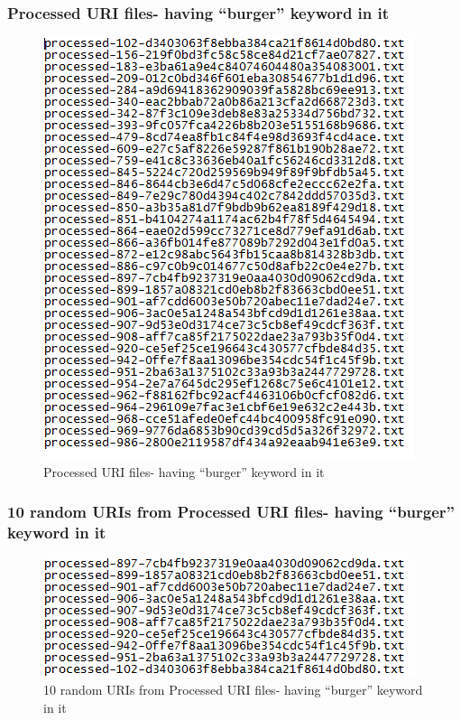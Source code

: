 \subsubsection{Processed URI files- having ``burger'' keyword in it}
\begin{figure}[ht]    
    \begin{center}
        \includegraphics[scale=0.9]{uris_with_burger.png}
        \caption{Processed URI files- having ``burger'' keyword in it}
        \label{Processed URI files- having ``burger'' keyword in it}
    \end{center}
\end{figure}
\newpage
\subsubsection{10 random URIs from Processed URI files- having ``burger'' keyword in it}
\begin{figure}[ht]    
    \begin{center}
        \includegraphics[scale=1]{10uris_with_burger.png}
        \caption{10 random URIs from Processed URI files- having ``burger'' keyword in it}
        \label{10 random URIs from Processed URI files- having ``burger'' keyword in it}
    \end{center}
\end{figure}

